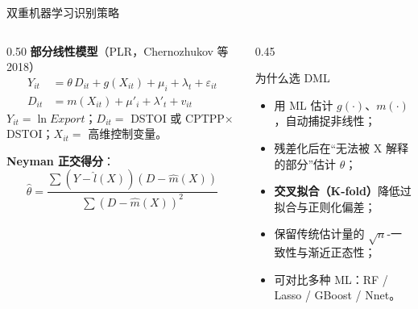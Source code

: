 \documentclass[aspectratio=169,10pt]{ctexbeamer}
\newcommand{\hl}[1]{\textcolor{XJTUBlue}{\textbf{#1}}}
\begin{document}
\begin{frame}{双重机器学习识别策略}
  \begin{columns}[T,totalwidth=\textwidth]
    \begin{column}{0.50\textwidth}
      \small
      \textbf{部分线性模型}（PLR，Chernozhukov 等 2018）
      \begin{align*}
        Y_{it} &= \theta\, D_{it} + g(X_{it}) + \mu_i + \lambda_t + \varepsilon_{it}\\[-0.2em]
        D_{it} &= m(X_{it}) + \mu'_i + \lambda'_t + v_{it}
      \end{align*}
      \footnotesize
      $Y_{it}=\ln Export$；$D_{it}=$ DSTOI 或 CPTPP$\times$DSTOI；$X_{it}=$ 高维控制变量。
      \vspace{0.3em}

      \textbf{Neyman 正交得分}：
      \[
      \hat{\theta}=\frac{\sum (Y-\hat l(X))(D-\hat m(X))}{\sum (D-\hat m(X))^{2}}
      \]
    \end{column}
    \begin{column}{0.45\textwidth}
      \begin{block}{为什么选 DML}
        \footnotesize
        \begin{itemize}
          \item 用 ML 估计 $g(\cdot)$、$m(\cdot)$，自动捕捉非线性；
          \item 残差化后在“无法被 X 解释的部分”估计 $\theta$；
          \item \hl{交叉拟合（K-fold）}降低过拟合与正则化偏差；
          \item 保留传统估计量的 $\sqrt{n}$-一致性与渐近正态性；
          \item 可对比多种 ML：RF / Lasso / GBoost / Nnet。
        \end{itemize}
      \end{block}
    \end{column}
  \end{columns}
\end{frame}
\end{document}
